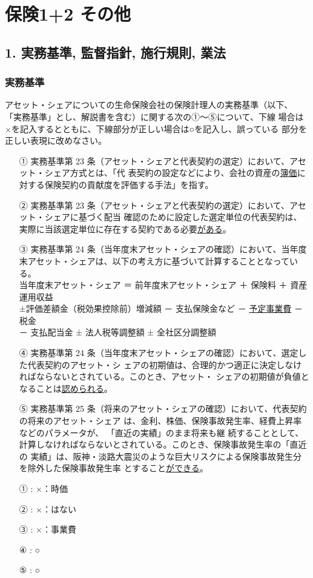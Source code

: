 \documentclass[report,gutter=10mm,fore-edge=10mm,uplatex,dvipdfmx]{jlreq}
\begin{document}
\chapter{保険1+2 その他}
\section{1.   実務基準, 監督指針, 施行規則, 業法}

\subsection{実務基準}

アセット・シェアについての生命保険会社の保険計理人の実務基準（以下、
「実務基準」とし、解説書を含む）に関する次の①～⑤について、下線
場合は×を記入するとともに、下線部分が正しい場合は○を記入し、誤っている
部分を正しい表現に改めなさい。

\begin{itemize}
 \item [①] 実務基準第 23 条（アセット・シェアと代表契約の選定）において、アセット・シェア方式とは、「代
表契約の設定などにより、会社の資産の\underline{簿価}に対する保険契約の貢献度を評価する手法」を指す。
 \item [②] 実務基準第 23 条（アセット・シェアと代表契約の選定）において、アセット・シェアに基づく配当
確認のために設定した選定単位の代表契約は、実際に当該選定単位に存在する契約である必要\underline{がある}。
\item[③] 実務基準第 24 条（当年度末アセット・シェアの確認）において、当年度末アセット・シェアは、以下の考え方に基づいて計算することとなっている。\\
当年度末アセット・シェア ＝ 前年度末アセット・シェア ＋ 保険料 ＋ 資産運用収益\\
±評価差額金（税効果控除前）増減額 － 支払保険金など － \underline{予定事業費} － 税金\\
－ 支払配当金 ± 法人税等調整額 ± 全社区分調整額
\item[④] 実務基準第 24 条（当年度末アセット・シェアの確認）において、選定した代表契約のアセット・シ
ェアの初期値は、合理的かつ適正に決定しなければならないとされている。このとき、アセット・
シェアの初期値が負値となることは\underline{認められる}。
\item[⑤] 実務基準第 25 条（将来のアセット・シェアの確認）において、代表契約の将来のアセット・シェア
は、金利、株価、保険事故発生率、経費上昇率などのパラメータが、
「直近の実績」のまま将来も継
続することとして、計算しなければならないとされている。このとき、保険事故発生率の「直近の
実績」は、阪神・淡路大震災のような巨大リスクによる保険事故発生分を除外した保険事故発生率
とすること\underline{ができる}。
\end{itemize}
\answer{}
\begin{itemize}
\item[ ① : ]  ×：時価 
\item[ ② : ]  ×：はない 
\item[ ③ : ]  ×：事業費 
\item[ ④ : ]  ○ 
\item[ ⑤ : ]  ○
\end{itemize}
\end{document}
